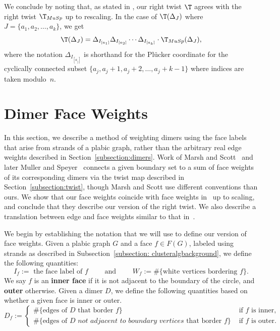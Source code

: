 We conclude by noting that, as stated in \cite[Remark 6.3]{mullerspeyer}, our right twist $\T$ agrees with the right twist $\T_{MuSp}$ up to rescaling. In the case of $\T(\Delta_J)$ where $J = \{a_1,a_2,\dots, a_k\}$, we get
\begin{equation}\label{eq:musprmk}
    \T(\Delta_J) = \Delta_{I_{[a_1]}}\Delta_{I_{[a_2]}}\cdots \Delta_{I_{[a_k]}} \cdot \T_{MuSp}(\Delta_J),
\end{equation}
where the notation $\Delta_{I_{[a_j]}}$ is shorthand for the Pl\"ucker coordinate for the cyclically connected subset $\{a_j, a_j+1, a_j+2, \dots, a_j + k-1\}$ where indices are taken modulo~$n$.

\section{Dimer Face Weights}\label{section:facewts}
In this section, we describe a method of weighting dimers using the face labels that arise from strands of a plabic graph, rather than the arbitrary real edge weights described in Section~\ref{subsection:dimers}. Work of Marsh and Scott~\cite{marshscott2016} and later Muller and Speyer~\cite{mullerspeyer} connects a given boundary set to a sum of face weights of its corresponding dimers via the twist map described in Section~\ref{subsection:twist}, though Marsh and Scott use different conventions than ours. We show that our face weights coincide with face weights in~\cite{mullerspeyer} up to scaling, and conclude that they describe our version of the right twist. We also describe a translation between edge and face weights similar to that in~\cite{marshscott2016}.

We begin by establishing the notation that we will use to define our version of face weights. 
Given a plabic graph $G$ and a face $f \in F(G)$, labeled using strands as described in Subsection~\ref{subsection: clusteralgbackground}, we define the following quantities:
$$I_f := \text{ the face label of } f \hspace{2em} \text{ and } \hspace{2em} W_f := \#\{\text{white vertices bordering } f\}.$$
We say $f$ is an \textbf{inner face} if it is not adjacent to the boundary of the circle, and \textbf{outer} otherwise. Given a dimer $D$, we define the following quantities based on whether a given face is inner or outer. 
{\small $$D_f := \begin{cases}
    \#\{\text{edges of } D \text{ that border } f\} &\text{ if } f \text{ is inner},\\
    \#\{\text{edges of } D \textit{ not adjacent to boundary vertices}\text{ that border } f\} &\text{ if } f \text{ is outer}.
\end{cases}$$}

